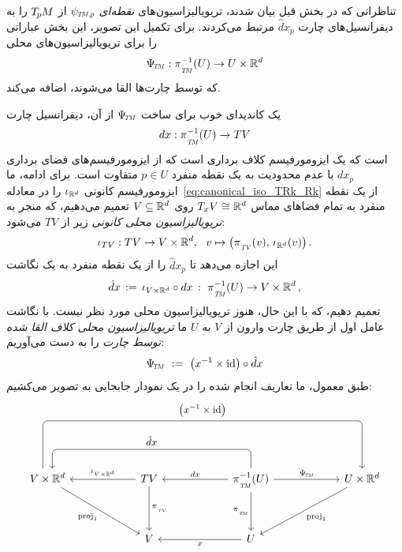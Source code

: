 تناظراتی که در بخش قبل بیان شدند، تریویالیزاسیون‌های \emph{نقطه‌ای} $\psiTMp$ از $T_{\mkern-1.5mu p}\mkern-.5muM$ را به دیفرانسیل‌های چارت $\hat{d}x_p$ مرتبط می‌کردند.
برای تکمیل این تصویر، این بخش عباراتی را برای تریویالیزاسیون‌های محلی
\begin{align}
	\PsiTM: \piTM^{-1}(U) \to U \times \R^d
\end{align}
که توسط چارت‌ها القا می‌شوند، اضافه می‌کند.

یک کاندیدای خوب برای ساخت $\PsiTM$ از آن، دیفرانسیل چارت
\begin{align}
	dx: \piTM^{-1}(U) \to TV
\end{align}
است که یک ایزومورفیسم کلاف برداری است که از ایزومورفیسم‌های فضای برداری $dx_p$ با عدم محدودیت به یک نقطه منفرد $p \in U$ متفاوت است.
برای ادامه، ما ایزومورفیسم کانونی $\iota_{\mathbb{R}^d}$ را در معادله~\eqref{eq:canonical_iso_TRk_Rk} از یک نقطه منفرد به تمام فضاهای مماس $T_xV \cong \mathbb{R}^d$ روی $V \subseteq \mathbb{R}^d$ تعمیم می‌دهیم، که منجر به \emph{تریویالیزاسیون محلی کانونی} زیر از $TV$ می‌شود:
\begin{align}
	\iota_{TV}: TV \to V\times\R^d,\ \ v \mapsto \big( \piTV(v),\, \iota_{\R^d}(v) \big) \,.
\end{align}
این اجازه می‌دهد تا $\hat{d}x_p$ را از یک نقطه منفرد به یک نگاشت
\begin{align}
	\hat{d}x\, :=\, \iota_{V\times\R^d} \circ dx \,:\ \piTM^{-1}(U) \to V \times \R^d \,,
\end{align}
تعمیم دهیم، که با این حال، هنوز تریویالیزاسیون محلی مورد نظر نیست.
با نگاشت عامل اول از طریق چارت وارون از $V$ به $U$ ما \emph{تریویالیزاسیون محلی کلاف القا شده توسط چارت} را به دست می‌آوریم:
\begin{align}
	\PsiTM\ :=\ \big(x^{-1} \times \id \big) \circ \hat{d}x
\end{align}
طبق معمول، ما تعاریف انجام شده را در یک نمودار جابجایی به تصویر می‌کشیم:
\begin{equation}\label{cd:coordinate_basis_bundle_trivialization}
	\begin{tikzcd}[row sep=3.5em, column sep=6em]
		V \times \R^d
		\arrow[rrr, rounded corners, to path={ 
			([xshift=-1ex]\tikztostart.north)
			|- node[above, pos=.75]{\small$\big( x^{-1} \times \id \big)$} ([yshift=10ex]\tikztotarget.north)
			-- (\tikztotarget.north)
		}]
		\arrow[dr, "\proj_1"']
		&
		TV  \arrow[d, "\piTV"]
		\arrow[l, "\iota_{V \times \R^d}"']
		&
		\piTM^{-1}(U)
		\arrow[d, "\piTM"']
		\arrow[r, "\PsiTM"]
		\arrow[l, "dx"']
		\arrow[ll, rounded corners, to path={ 
			|- node[above, pos=.75]{\small$\hat{d}x$} ([yshift=4ex, xshift=1ex]\tikztotarget.north)
			-- ([xshift=1ex]\tikztotarget.north)
		}]
		&
		U \times \R^d
		\arrow[ld, "\proj_1"]
		\\
		&
		V
		&
		U
		\arrow[l, "x"]
	\end{tikzcd}
\end{equation}

